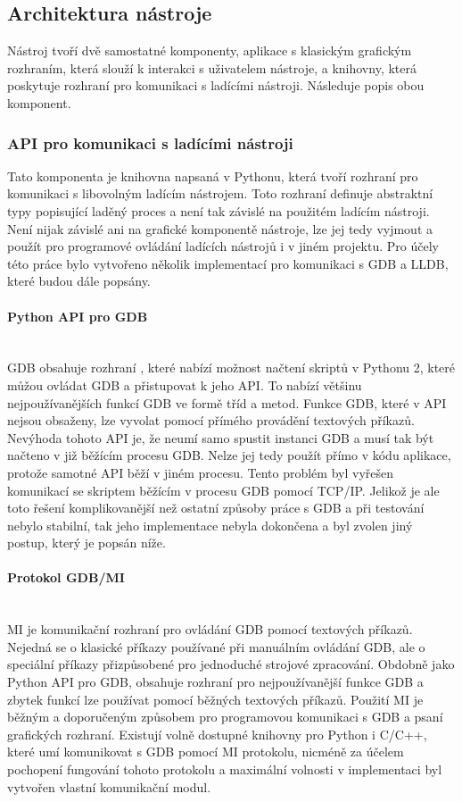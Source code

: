 \documentclass[bc,male,java,dept460]{diploma}						%
\newcommand{\lineparagraph}[1]{\paragraph{#1}\mbox{}\\}
\begin{document}
	\subsection{Architektura nástroje}
		Nástroj tvoří dvě samostatné komponenty, aplikace s klasickým grafickým rozhraním, která slouží k interakci s uživatelem nástroje, a knihovny, která
		poskytuje rozhraní pro komunikaci s ladícími nástroji. Následuje popis obou komponent.
		
		
		\subsubsection{API pro komunikaci s ladícími nástroji}
			Tato komponenta je knihovna napsaná v Pythonu, která tvoří rozhraní pro komunikaci s libovolným ladícím nástrojem. Toto rozhraní definuje abstraktní typy
			popisující laděný proces a není tak závislé na použitém ladícím nástroji. Není nijak závislé ani na grafické komponentě nástroje, lze jej tedy vyjmout
			a použít pro programové ovládání ladících nástrojů i v jiném projektu. Pro účely této práce bylo vytvořeno několik implementací pro komunikaci s GDB
			a LLDB, které budou dále popsány.

			\lineparagraph{Python API pro GDB}
			GDB obsahuje rozhraní \cite{gdb-python}, které nabízí možnost načtení skriptů v Pythonu 2, které můžou ovládat GDB a přistupovat k jeho API. To nabízí
			většinu nejpoužívanějších funkcí GDB ve formě tříd a metod. Funkce GDB, které v API nejsou obsaženy, lze vyvolat pomocí přímého provádění textových
			příkazů. Nevýhoda tohoto API je, že neumí samo spustit instanci GDB a musí tak být načteno v již běžícím procesu GDB. Nelze jej tedy použít přímo
			v kódu aplikace, protože samotné API běží v jiném procesu. Tento problém byl vyřešen komunikací se skriptem běžícím v procesu GDB pomocí TCP/IP.
			Jelikož je ale toto řešení komplikovanější než ostatní způsoby práce s GDB a při testování nebylo stabilní, tak jeho implementace nebyla dokončena
			a byl zvolen jiný postup, který je popsán níže.
			
			\lineparagraph{Protokol GDB/MI}
			MI je komunikační rozhraní pro ovládání GDB pomocí textových příkazů. Nejedná se o klasické příkazy používané při manuálním ovládání GDB, ale o
			speciální příkazy přizpůsobené pro jednoduché strojové zpracování. Obdobně jako Python API pro GDB, obsahuje rozhraní pro nejpoužívanější funkce GDB a
			zbytek funkcí lze používat pomocí běžných textových příkazů. Použití MI je běžným a doporučeným \cite{gdb-mi-usage} způsobem pro programovou komunikaci
			s GDB a psaní grafických rozhraní. Existují volně dostupné knihovny pro Python i C/C++, které umí komunikovat s GDB pomocí MI protokolu, nicméně za
			účelem pochopení fungování tohoto protokolu a maximální volnosti v implementaci byl vytvořen vlastní komunikační modul.
			
\end{document}
